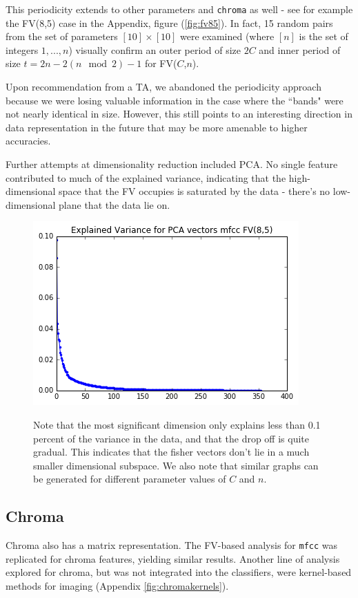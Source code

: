 \documentclass{article}
\begin{document}
This periodicity extends to other parameters and \texttt{chroma} as well - see for example the FV(8,5) case in the Appendix, figure (\ref{fig:fv85}). In fact, 15 random pairs from the set of parameters $[10]\times[10]$ were examined (where $[n]$ is the set of integers $1, ..., n$) visually confirm an outer period of size $2C$ and inner period of size $t=2n-2(n\mod 2)-1$ for FV($C$,$n$).

Upon recommendation from a TA, we abandoned the periodicity approach because we were losing valuable information in the case where the ``bands" were not nearly identical in size. However, this still points to an interesting direction in data representation in the future that may be more amenable to higher accuracies.

Further attempts at dimensionality reduction included PCA. No single feature contributed to much of the explained variance, indicating that the high-dimensional space that the FV occupies is saturated by the data - there's no low-dimensional plane that the data lie on.

\begin{figure}[H]
    \centering
    \includegraphics[scale=0.3]{pca-mfcc8-5.png}
    \label{fig:pca}
    \caption{Note that the most significant dimension only explains less than 0.1 percent of the variance
    in the data, and that the drop off is quite gradual.
    This indicates that the fisher vectors don't lie in a much smaller dimensional subspace.
    We also note that similar graphs can be generated for different parameter values of $C$ and $n$.}
\end{figure}


\subsection{Chroma}

Chroma also has a matrix representation. The FV-based analysis for \texttt{mfcc} was replicated for chroma features, yielding similar results. Another line of analysis explored for chroma, but was not integrated into the classifiers, were kernel-based methods for imaging (Appendix \ref{fig:chromakernels}).
\end{document}
